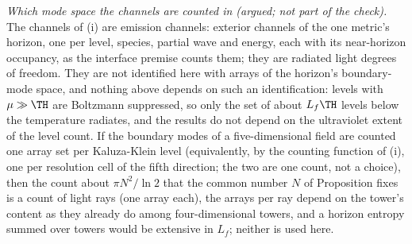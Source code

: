 \emph{Which mode space the channels are counted in (argued; not part of the check).} The channels of (i) are emission channels: exterior channels of the one metric's horizon, one per level, species, partial wave and energy, each with its near-horizon occupancy, as the interface premise counts them; they are radiated light degrees of freedom. They are not identified here with arrays of the horizon's boundary-mode space, and nothing above depends on such an identification: levels with $\mu \gg \TH$ are Boltzmann suppressed, so only the set of about $L_{f}\TH$ levels below the temperature radiates, and the results do not depend on the ultraviolet extent of the level count. If the boundary modes of a five-dimensional field are counted one array set per Kaluza-Klein level (equivalently, by the counting function of (i), one per resolution cell of the fifth direction; the two are one count, not a choice), then the count about $\pi N^{2}/\ln 2$ that the common number $N$ of Proposition  fixes is a count of light rays (one array each), the arrays per ray depend on the tower's content as they already do among four-dimensional towers, and a horizon entropy summed over towers would be extensive in $L_{f}$; neither is used here.
